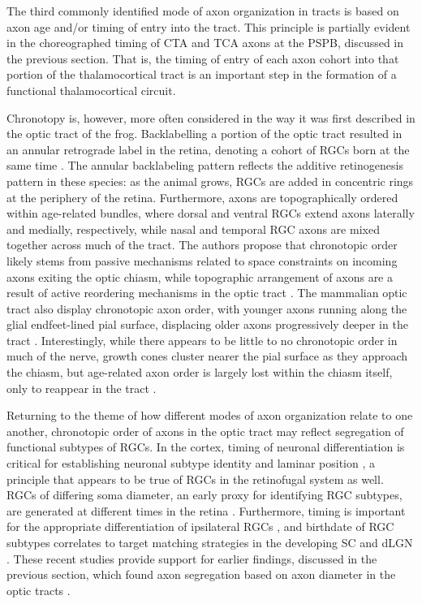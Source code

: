 \label{sec:Chronotopy}
The third commonly identified mode of axon organization in tracts is based on axon age and/or timing of entry into the tract. 
This principle is partially evident in the choreographed timing of CTA and TCA axons at the PSPB, discussed in the previous section.
That is, the timing of entry of each axon cohort into that portion of the thalamocortical tract is an important step in the formation of a functional thalamocortical circuit.

Chronotopy is, however, more often considered in the way it was first described in the optic tract of the frog.
Backlabelling a portion of the optic tract resulted in an annular retrograde label in the retina, denoting a cohort of RGCs born at the same time \cite{fawcett1984fibre,reh1983organization}.
The annular backlabeling pattern reflects the additive retinogenesis pattern in these species: as the animal grows, RGCs are added in concentric rings at the periphery of the retina.
Furthermore, axons are topographically ordered within age-related bundles, where dorsal and ventral RGCs extend axons laterally and medially, respectively, while nasal and temporal RGC axons are mixed together across much of the tract.
The authors propose that chronotopic order likely stems from passive mechanisms related to space constraints on incoming axons exiting the optic chiasm, while topographic arrangement of axons are a result of active reordering mechanisms in the optic tract \cite{reh1983organization}.
The mammalian optic tract also display chronotopic axon order, with younger axons running along the glial endfeet-lined pial surface, displacing older axons progressively deeper in the tract \cite{colello1992observations,reese1987distributionrat,reese1990fibre,reese1997chronotopic,walsh1985age}.
Interestingly, while there appears to be little to no chronotopic order in much of the nerve, growth cones cluster nearer the pial surface as they approach the chiasm, but age-related axon order is largely lost within the chiasm itself, only to reappear in the tract \cite{colello1998changing,colello1992observations,reese1987distributionrat}.

Returning to the theme of how different modes of axon organization relate to one another, chronotopic order of axons in the optic tract may reflect segregation of functional subtypes of RGCs.
In the cortex, timing of neuronal differentiation is critical for establishing neuronal subtype identity and laminar position \cite{molyneaux2007neuronal}, a principle that appears to be true of RGCs in the retinofugal system as well.
RGCs of differing soma diameter, an early proxy for identifying RGC subtypes, are generated at different times in the retina \cite{rapaport1995spatiotemporal,reese1994birthdates}.
Furthermore, timing is important for the appropriate differentiation of ipsilateral RGCs \cite{bhansali2014delayed}, and birthdate of RGC subtypes correlates to target matching strategies in the developing SC and dLGN \cite{osterhout2014birthdate}.
These recent studies provide support for earlier findings, discussed in the previous section, which found axon segregation based on axon diameter in the optic tracts \cite{reese1987distributionrat,guillery1982arrangement,torrealba1982studies,reese1990fibre}.

